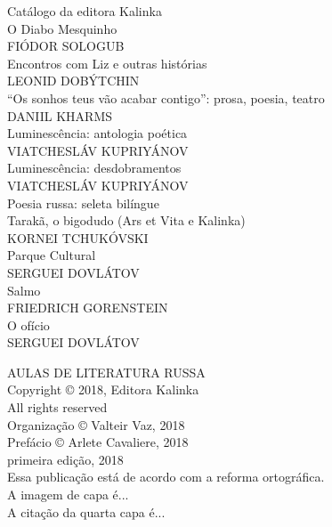 \afterpage{\blankpage}

\newpage
\pagestyle{empty}
\MyriadPro

\noindent{}Catálogo da editora Kalinka\\[5pt]

\noindent{}O Diabo Mesquinho\\
FIÓDOR SOLOGUB\\

\noindent{}Encontros com Liz e outras histórias\\
LEONID DOBÝTCHIN\\

\noindent{}``Os sonhos teus vão acabar contigo'': prosa, poesia, teatro\\
DANIIL KHARMS\\

\noindent{}Luminescência: antologia poética\\
VIATCHESLÁV KUPRIYÁNOV\\

\noindent{}Luminescência: desdobramentos\\
VIATCHESLÁV KUPRIYÁNOV\\

\noindent{}Poesia russa: seleta bilíngue\\

\noindent{}Tarakã, o bigodudo (Ars et Vita e Kalinka)\\
KORNEI TCHUKÓVSKI\\

\noindent{}Parque Cultural\\
SERGUEI DOVLÁTOV\\

\noindent{}Salmo\\
FRIEDRICH GORENSTEIN\\

\noindent{}O ofício\\
SERGUEI DOVLÁTOV\\

\newpage
\pagestyle{empty}
\MyriadPro
\scriptsize
\begin{center}
AULAS DE LITERATURA RUSSA\\[6pt]

Copyright © 2018, Editora Kalinka\\[6pt]

All rights reserved\\[20pt]

Organização © Valteir Vaz, 2018\\[6pt]

Prefácio © Arlete Cavaliere, 2018\\[6pt]

primeira edição, 2018\\[40pt]


Essa publicação está de acordo com a reforma ortográfica.\\[6pt]
A imagem de capa é...\\[6pt]	
A citação da quarta capa é...\\[20pt] 
\end{center}


